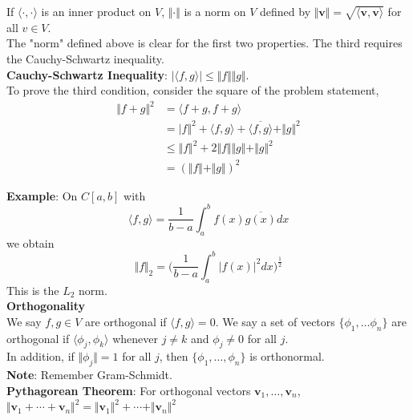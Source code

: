 \documentclass[12pt]{article}
\begin{document}
\noindent If $\langle \cdot , \cdot \rangle$ is an inner product on $V$, $\Vert \cdot \Vert$ is a norm on $V$ defined by $\Vert \textbf{v} \Vert= \sqrt{\langle \textbf{v}, \textbf{v} \rangle}$ for all $v \in V$. \\

\noindent The "norm" defined above is clear for the first two properties. The third requires the Cauchy-Schwartz inequality. \\

\noindent \textbf{Cauchy-Schwartz Inequality}: $\vert \langle f,g \rangle \vert \leq \Vert f \Vert \Vert g \Vert$. \\

\noindent To prove the third condition, consider the square of the problem statement,
\begin{align*}
\Vert f+g \Vert^2 &= \langle f+g, f+g \rangle \\
&= \vert f\Vert^2 + \langle f, g \rangle + \overline{\langle f,g \rangle} + \Vert g \Vert^2 \\
&\leq \Vert f \Vert^2 + 2 \Vert f \Vert \Vert g \Vert + \Vert g\Vert^2 \\
&= (\Vert f \Vert + \Vert g \Vert)^2
\end{align*}

\noindent \textbf{Example}: On $C[a,b]$ with 
$$\langle f, g \rangle = \frac{1}{b-a} \int^b_a f(x)\overline{g(x)} dx$$
we obtain
$$\Vert f \Vert_2 = \Big( \frac{1}{b-a} \int^b_a \vert f(x) \vert^2 dx \Big)^\frac{1}{2}$$
\noindent This is the $L_2$ norm. \\

\noindent \textbf{Orthogonality} \\
We say $f,g \in V$ are orthogonal if $\langle f, g \rangle = 0$. We say a set of vectors $\{\phi_1, \dots \phi_n\}$ are orthogonal if $\langle \phi_j, \phi_k \rangle$ whenever $j \not = k$ and $\phi_j \not= 0$ for all $j$.  \\

\noindent In addition, if $\Vert \phi_j \Vert = 1$ for all $j$, then $\{ \phi_1, \dots, \phi_n\}$ is orthonormal. \\

\textbf{Note}: Remember Gram-Schmidt. \\

\noindent \textbf{Pythagorean Theorem}: For orthogonal vectors $\textbf{v}_1, \dots, \textbf{v}_n$, $\Vert \textbf{v}_1 + \cdots + \textbf{v}_n \Vert^2 = \Vert \textbf{v}_1 \Vert^2 + \cdots + \Vert \textbf{v}_n \Vert^2$ \\
\end{document}

